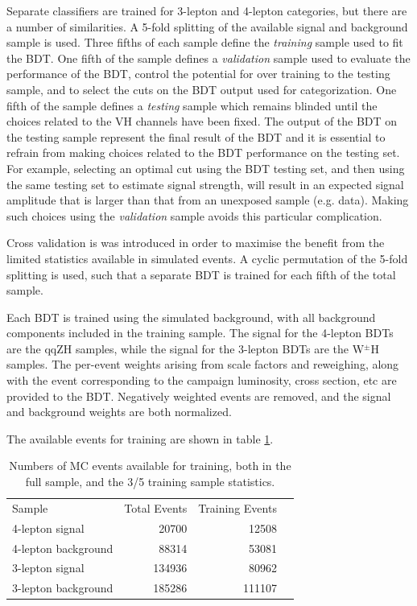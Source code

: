 Separate classifiers are trained for 3-lepton and 4-lepton categories, but there are a number of similarities.
A 5-fold splitting of the available signal and background sample is used.
Three fifths of each sample define the \emph{training} sample used to fit the BDT.
One fifth of the sample defines a \emph{validation} sample used to evaluate the performance of the BDT, control the potential for over training to the testing sample, and to select the cuts on the BDT output used for categorization.
One fifth of the sample defines a \emph{testing} sample which remains blinded until the choices related to the VH channels have been fixed.
The output of the BDT on the testing sample represent the final result of the BDT and it is essential to refrain from making choices related to the BDT performance on the testing set.
For example, selecting an optimal cut using the BDT testing set, and then using the same testing set to estimate signal strength, will result in an expected signal amplitude that is larger than that from an unexposed sample 
(e.g. data).
Making such choices using the \emph{validation} sample avoids this particular complication.

Cross validation is was introduced in order to maximise the benefit from the limited statistics available in simulated events. A cyclic permutation of the 5-fold splitting is used, such that a separate BDT is trained for each fifth of the total sample.

Each BDT is trained using the simulated background, with all background components included in the training sample.
The signal for the 4-lepton BDTs are the qqZH samples, while the signal for the 3-lepton BDTs are the W$^\pm$H samples. The per-event weights arising from scale factors and reweighing, along with the event corresponding to the campaign luminosity, cross section, etc are provided to the BDT. Negatively weighted events are removed, and the signal and background weights are both normalized.

The available events for training are shown in table \ref{tab:hmmSampleStatistics}.

\begin{table}[htbp]
 \begin{center}
\begin{tabular}{l r r r}\toprule
Sample               & Total Events & Training Events \\
4-lepton signal      & 20700        & 12508    \\
4-lepton background  & 88314        & 53081    \\
3-lepton signal      & 134936       & 80962    \\
3-lepton background  & 185286       & 111107   \\
\bottomrule\end{tabular} 
 \end{center}
 \caption{Numbers of MC events available for training, both in the full sample, and the 3/5 training sample statistics.}
\label{tab:hmmSampleStatistics}
\end{table}

